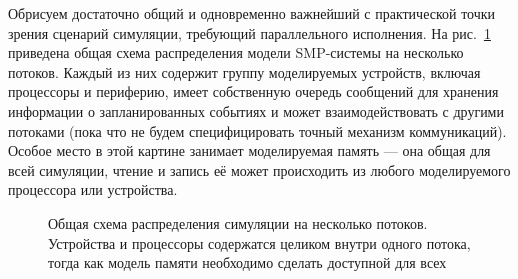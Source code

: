 Обрисуем достаточно общий и одновременно важнейший с практической точки зрения сценарий симуляции, требующий параллельного исполнения. На рис.~\ref{fig:parsim-overview} приведена общая схема распределения модели SMP-системы на несколько потоков. Каждый из них содержит группу моделируемых устройств, включая процессоры и периферию, имеет собственную очередь сообщений для хранения информации о запланированных событиях и может взаимодействовать с другими потоками (пока что не будем специфицировать точный механизм коммуникаций). Особое место в этой картине занимает моделируемая память --- она общая для всей симуляции, чтение и запись её может происходить из любого моделируемого процессора или устройства.

\begin{figure}[htbp]
    \centering
    \caption[Общая схема распределения симуляции на несколько потоков]{Общая схема распределения симуляции на несколько потоков. Устройства и процессоры содержатся целиком внутри одного потока, тогда как модель памяти необходимо сделать доступной для всех}
    \label{fig:parsim-overview}
\end{figure}

